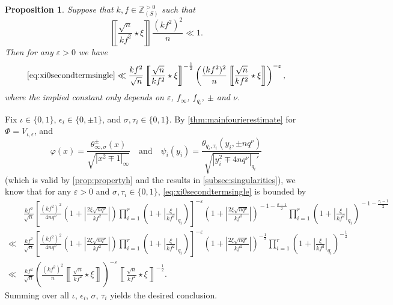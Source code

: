 \documentclass[10pt,oneside,reqno]{amsart}
\makeatletter
\newcommand\ZZ{\mathbb{Z}}
\theoremstyle{THEOREM}
\newtheorem{proposition}[theorem]{Proposition}
\theoremstyle{DEFINITION}
\theoremstyle{EXERCISE}
\numberwithin{equation}{section}
\renewenvironment{proof}[1][\proofname]{\par
  \vspace{-6pt}
  \pushQED{\qed}
  \normalfont \topsep6\p@\@plus6\p@\relax
  \trivlist
  \item[\hskip\labelsep\rmfamily\bfseries
    #1\@addpunct{:}]\ignorespaces
}{
  \popQED\endtrivlist\@endpefalse
  \vspace{-6pt}
}
\makeatother
\begin{document}
\begin{proposition}\label{prop:xi0secondterm2}
Suppose that $k,f\in \ZZ_{(S)}^{>0}$ such that
\[
\left\llbracket\frac{\sqrt{n}}{kf^2}\star \xi\right\rrbracket\frac {(kf^2)^2}{n} \ll 1.
\]
Then for any $\varepsilon>0$ we have
\[
  \eqref{eq:xi0secondtermsingle}
   \ll \frac{kf^2}{\sqrt{n}}\left\llbracket\frac{\sqrt{n}}{kf^2}\star \xi\right\rrbracket^{-\frac 12}\left(\frac{(kf^2)^2}{n}\left\llbracket\frac{\sqrt{n}}{kf^2}\star \xi\right\rrbracket\right)^{-\varepsilon},
\]
where the implied constant only depends on $\varepsilon$, $f_\infty$, $f_{q_i}$, $\pm$ and $\nu$.
\end{proposition}
\begin{proof}
Fix $\iota\in\{0,1\}$, $\epsilon_i\in \{0,\pm 1\}$, and $\sigma,\tau_i\in \{0,1\}$. 
By \autoref{thm:mainfourierestimate} for $\Phi=V_{\iota,\epsilon}$, and
\[
\varphi(x)=\frac{\theta_{\infty,\sigma}^\pm(x)}{\sqrt{|x^2\mp 1|_\infty}}\quad\text{and}\quad \psi_i(y_i)=\frac{\theta_{q_i,\tau_i}(y_i,\pm nq^\nu)}{\sqrt{|y_i^2\mp 4nq^\nu|_{q_i}'}}
\]
(which is valid by \autoref{prop:propertyh} and the results in \autoref{subsec:singularities}), we know that for any $\varepsilon>0$ and $\sigma,\tau_i\in \{0,1\}$, \eqref{eq:xi0secondtermsingle} is bounded by
\begin{align*}
&\frac{kf^2}{\sqrt{n}} \left[\frac{(kf^2)^2}{4nq^\nu}\!\left(1+\left|\frac{2\xi\sqrt{nq^\nu}}{kf^2}\right|\right) \prod_{i=1}^{r}\left(1+\left|\frac{\xi}{kf^2}\right|_{q_i}\right)\right] ^{-\varepsilon} \left(1+\left|\frac{2\xi\sqrt{nq^\nu}}{kf^2}\right|\right)^{\!\!-1-\frac{\sigma-1}{2}} \prod_{i=1}^{r}\left(1+\left|\frac{\xi}{kf^2}\right|_{q_i}\right)^{\!\!-1-\frac{\tau_i-1}{2}}\\
\ll&\frac{kf^2}{\sqrt{n}} \left[\frac{(kf^2)^2}{4nq^\nu}\left(1+\left|\frac{2\xi\sqrt{nq^\nu}}{kf^2}\right|\right) \prod_{i=1}^{r}\left(1+\left|\frac{\xi}{kf^2}\right|_{q_i}\right)\right]^{-\varepsilon} \left(1+\left|\frac{2\xi\sqrt{nq^\nu}}{kf^2}\right|\right)^{-\frac12} \prod_{i=1}^{r}\left(1+\left|\frac{\xi}{kf^2}\right|_{q_i}\right)^{-\frac12}\\
\ll&  \frac{kf^2}{\sqrt{n}} \left(\frac{(kf^2)^2}{n}\left\llbracket\frac{\sqrt{n}}{kf^2}\star \xi\right\rrbracket\right)^{-\varepsilon} \left\llbracket\frac{\sqrt{n}}{kf^2}\star \xi\right\rrbracket^{-\frac12}.
\end{align*}
Summing over all $\iota$, $\epsilon_i$, $\sigma$, $\tau_i$ yields the desired conclusion.
\end{proof}
\end{document}
